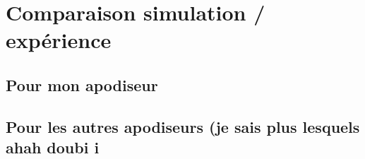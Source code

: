 \section{Comparaison simulation / expérience}

\subsection{Pour mon apodiseur}

\subsection{Pour les autres apodiseurs (je sais plus lesquels ahah doubi ^^)}